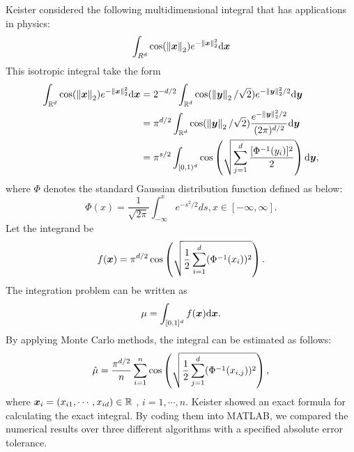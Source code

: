 \documentclass{iitthesis}
\theoremstyle{definition}
\begin{document}
\label{subsec:keitertestfunmeanMCg}
Keister \cite{Keister96} considered the following multidimensional integral that has applications in physics:
\begin{equation}\label{KeisterTestFun}
\int_{R^d} \cos (\norm[2]{\vx})e^{-\norm[2]{\vx}^2} \dif \vx 
\end{equation}
This isotropic integral take the form
\begin{align*}
 \int_{\reals^d} \cos (\norm[2]{\vx})e^{-\norm[2]{\vx}^2} \dif \vx &= 2^{-d/2}\int_{\reals^d} \cos(\norm[2]{\vy}/\sqrt{2}) e^{-\norm[2]{\vy}^2/2} \dif \vy \\
&= \pi^{d/2} \int_{\reals^d} \cos(\norm[2]{\vy}/\sqrt{2}) \frac{e^{-\norm[2]{\vy}^2/2}}{(2\pi)^{d/2}} \dif \vy\\
 &= \pi^{s/2} \int_{[0,1)^d} \cos \left ( \sqrt{\sum_{j=1}^d \frac{[\Phi^{-1}(y_i)]^2}{2}}\right )\dif \vy,
\end{align*}
where $\Phi$ denotes the standard Gaussian distribution function defined as below:
$$\Phi(x) = \frac{1}{\sqrt{2\pi}} \int_{-\infty}^x e^{-s^2/2}ds, x \in [-\infty, \infty].$$
Let the integrand be 
\begin{equation*}
f(\vx) = \pi^{d/2} \cos \left( \sqrt{\frac{1}{2} \sum_{i=1}^d (\Phi^{-1} (x_i))^2}\right).
\end{equation*}
The integration problem can be written as
\begin{equation*}
\mu = \int_{[0,1]^d} f(\vx)\dif\vx.
\end{equation*}
By applying Monte Carlo methods, the integral can be estimated as follows:
\begin{align}
\hmu = \frac{\pi^{d/2}}{n}\sum_{i=1}^n \cos \left (\sqrt{\frac12 \sum_{j=1}^d (\Phi^{-1}(x_{i,j}))^2}\right),
\end{align}
where $\vx_i = (x_{i1},\cdots,x_{id}) \in \reals$ , $i=1,\cdots, n.$
Keister \cite{Keister96} showed an exact formula for calculating the exact integral. By coding them into MATLAB, we compared the numerical results over three different algorithms with a specified absolute error tolerance.
\end{document}
